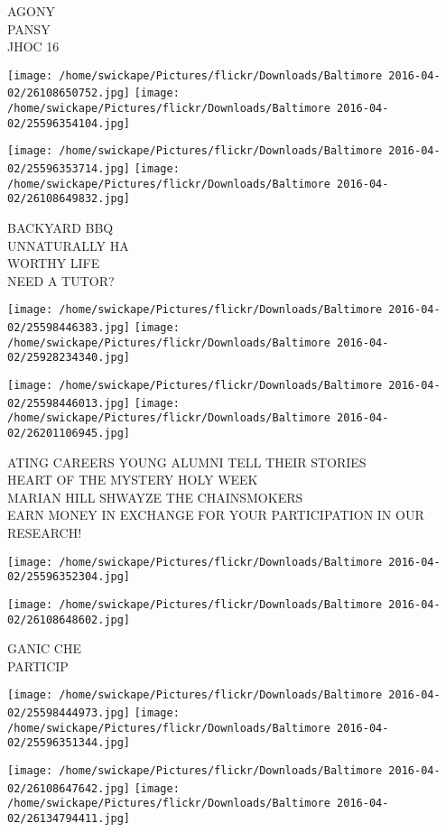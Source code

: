 \documentclass[10pt,letterpaper]{article}
\begin{document}
AGONY\\
PANSY\\
JHOC 16
\pagebreak

\texttt{[image: /home/swickape/Pictures/flickr/Downloads/Baltimore 2016-04-02/26108650752.jpg]}
\texttt{[image: /home/swickape/Pictures/flickr/Downloads/Baltimore 2016-04-02/25596354104.jpg]}

\texttt{[image: /home/swickape/Pictures/flickr/Downloads/Baltimore 2016-04-02/25596353714.jpg]}
\texttt{[image: /home/swickape/Pictures/flickr/Downloads/Baltimore 2016-04-02/26108649832.jpg]}

BACKYARD BBQ\\
UNNATURALLY HA\\
WORTHY LIFE\\
NEED A TUTOR?
\pagebreak

\texttt{[image: /home/swickape/Pictures/flickr/Downloads/Baltimore 2016-04-02/25598446383.jpg]}
\texttt{[image: /home/swickape/Pictures/flickr/Downloads/Baltimore 2016-04-02/25928234340.jpg]}

\texttt{[image: /home/swickape/Pictures/flickr/Downloads/Baltimore 2016-04-02/25598446013.jpg]}
\texttt{[image: /home/swickape/Pictures/flickr/Downloads/Baltimore 2016-04-02/26201106945.jpg]}

ATING CAREERS YOUNG ALUMNI TELL THEIR STORIES\\
HEART OF THE MYSTERY HOLY WEEK\\
MARIAN HILL SHWAYZE THE CHAINSMOKERS\\
EARN MONEY IN EXCHANGE FOR YOUR PARTICIPATION IN OUR RESEARCH!
\pagebreak

\texttt{[image: /home/swickape/Pictures/flickr/Downloads/Baltimore 2016-04-02/25596352304.jpg]}

\vspace{0.25in}
\texttt{[image: /home/swickape/Pictures/flickr/Downloads/Baltimore 2016-04-02/26108648602.jpg]}

GANIC CHE\\
PARTICIP
\pagebreak

\texttt{[image: /home/swickape/Pictures/flickr/Downloads/Baltimore 2016-04-02/25598444973.jpg]}
\texttt{[image: /home/swickape/Pictures/flickr/Downloads/Baltimore 2016-04-02/25596351344.jpg]}

\texttt{[image: /home/swickape/Pictures/flickr/Downloads/Baltimore 2016-04-02/26108647642.jpg]}
\texttt{[image: /home/swickape/Pictures/flickr/Downloads/Baltimore 2016-04-02/26134794411.jpg]}
\end{document}
